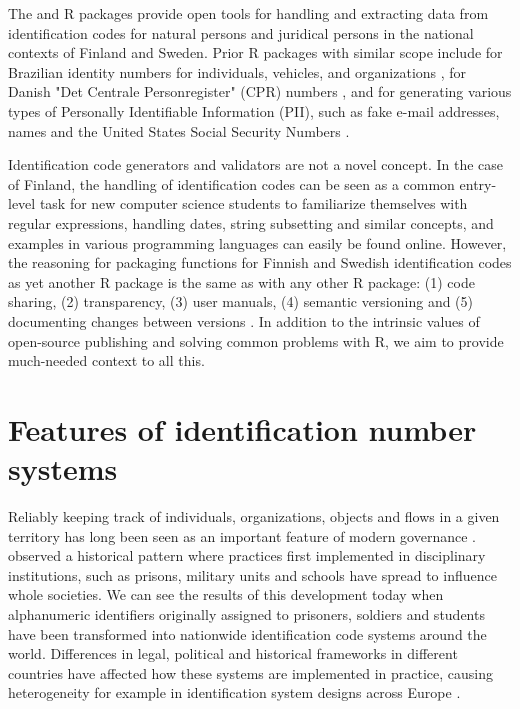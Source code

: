 The  and  R packages provide open tools for handling and extracting data from identification codes for natural persons and juridical persons in the national contexts of Finland and Sweden. Prior R packages with similar scope include  for Brazilian identity numbers for individuals, vehicles, and organizations \citep{numbersbr},  for Danish "Det Centrale Personregister" (CPR) numbers \citep{cprr}, and  for generating various types of Personally Identifiable Information (PII), such as fake e-mail addresses, names and the United States Social Security Numbers \citep{generator}.

Identification code generators and validators are not a novel concept. In the case of Finland, the handling of identification codes can be seen as a common entry-level task for new computer science students to familiarize themselves with regular expressions, handling dates, string subsetting and similar concepts, and examples in various programming languages can easily be found online. However, the reasoning for packaging functions for Finnish and Swedish identification codes as yet another R package is the same as with any other R package: (1) code sharing, (2) transparency, (3) user manuals, (4) semantic versioning and (5) documenting changes between versions \citep[as listed by][]{wickham2022}. In addition to the intrinsic values of open-source publishing and solving common problems with R, we aim to provide much-needed context to all this.

\section{Features of identification number systems}

Reliably keeping track of individuals, organizations, objects and flows in a given territory has long been seen as an important feature of modern governance \citep{dodge2005}. \citet[115-120]{foucault7778} observed a historical pattern where practices first implemented in disciplinary institutions, such as prisons, military units and schools have spread to influence whole societies. We can see the results of this development today when alphanumeric identifiers originally assigned to prisoners, soldiers and students have been transformed into nationwide identification code systems around the world. Differences in legal, political and historical frameworks in different countries have affected how these systems are implemented in practice, causing heterogeneity for example in identification system designs across Europe \citep{otjacques2007}.

